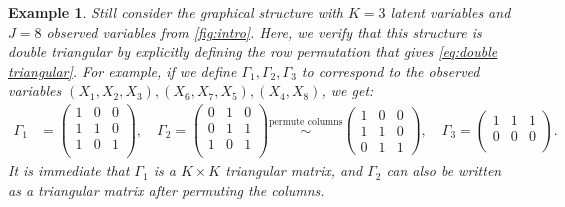 \documentclass[10pt]{article} %
\newtheorem{example}{Example}
\begin{document}
\begin{example}\label{ex:double triangular checking}
    Still consider the graphical structure with $K = 3$ latent variables and $J = 8$ observed variables from \cref{fig:intro}. Here, we verify that this structure is double triangular by explicitly defining the row permutation that gives \eqref{eq:double triangular}. For example, if we define $\Gamma_1, \Gamma_2, \Gamma_3$ to correspond to the observed variables $(X_1, X_2, X_3), (X_6, X_7, X_5), (X_4, X_8)$, we get:
    \begin{align*}
        \Gamma_1 &= \begin{pmatrix}
        1 & 0 & 0 \\
        1 & 1 & 0 \\
        1 & 0 & 1 \\
    \end{pmatrix}, \quad \Gamma_2 = \begin{pmatrix}
        0 & 1 & 0 \\
        0 & 1 & 1 \\
        1 & 0 & 1 \\
    \end{pmatrix} \stackrel{\text{permute columns}}{\sim} \begin{pmatrix}
        1 & 0 & 0 \\
        1 & 1 & 0 \\
        0 & 1 & 1 \end{pmatrix}, \quad \Gamma_3 = \begin{pmatrix}
        1 & 1 & 1 \\
        0 & 0 & 0 \\
    \end{pmatrix}.    
    \end{align*}
    It is immediate that $\Gamma_1$ is a $K \times K$ triangular matrix, and $\Gamma_2$ can also be written as a triangular matrix after permuting the columns.
\end{example}
\end{document}
